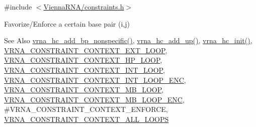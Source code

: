 {\ttfamily \#include $<$\hyperlink{constraints_8h}{Vienna\-R\-N\-A/constraints.\-h}$>$}



Favorize/\-Enforce a certain base pair (i,j) 

\begin{DoxySeeAlso}{See Also}
\hyperlink{group__hard__constraints_gadeb1083d0dc928e1e931065aae54ad82}{vrna\-\_\-hc\-\_\-add\-\_\-bp\-\_\-nonspecific()}, \hyperlink{group__hard__constraints_gaeb352e3e6ccd2b567bafa451365bb545}{vrna\-\_\-hc\-\_\-add\-\_\-up()}, \hyperlink{group__hard__constraints_ga36ff456c43bf920629cee5a236e4f0ff}{vrna\-\_\-hc\-\_\-init()}, \hyperlink{group__hard__constraints_ga9418eda62a5dec070896702c279d2548}{V\-R\-N\-A\-\_\-\-C\-O\-N\-S\-T\-R\-A\-I\-N\-T\-\_\-\-C\-O\-N\-T\-E\-X\-T\-\_\-\-E\-X\-T\-\_\-\-L\-O\-O\-P}, \hyperlink{group__hard__constraints_ga79203702b197b6b9d3b78eed40663eb1}{V\-R\-N\-A\-\_\-\-C\-O\-N\-S\-T\-R\-A\-I\-N\-T\-\_\-\-C\-O\-N\-T\-E\-X\-T\-\_\-\-H\-P\-\_\-\-L\-O\-O\-P}, \hyperlink{group__hard__constraints_ga21feeab3a9e5fa5a9e3d9ac0fcf5994f}{V\-R\-N\-A\-\_\-\-C\-O\-N\-S\-T\-R\-A\-I\-N\-T\-\_\-\-C\-O\-N\-T\-E\-X\-T\-\_\-\-I\-N\-T\-\_\-\-L\-O\-O\-P}, \hyperlink{group__hard__constraints_ga0536288e04ff6332ecdc23ca4705402b}{V\-R\-N\-A\-\_\-\-C\-O\-N\-S\-T\-R\-A\-I\-N\-T\-\_\-\-C\-O\-N\-T\-E\-X\-T\-\_\-\-I\-N\-T\-\_\-\-L\-O\-O\-P\-\_\-\-E\-N\-C}, \hyperlink{group__hard__constraints_ga456ecd2ff00056bb64da8dd4f61bbfc5}{V\-R\-N\-A\-\_\-\-C\-O\-N\-S\-T\-R\-A\-I\-N\-T\-\_\-\-C\-O\-N\-T\-E\-X\-T\-\_\-\-M\-B\-\_\-\-L\-O\-O\-P}, \hyperlink{group__hard__constraints_ga02a3d703ddbcfce393e4bbfcb9db7077}{V\-R\-N\-A\-\_\-\-C\-O\-N\-S\-T\-R\-A\-I\-N\-T\-\_\-\-C\-O\-N\-T\-E\-X\-T\-\_\-\-M\-B\-\_\-\-L\-O\-O\-P\-\_\-\-E\-N\-C}, \#\-V\-R\-N\-A\-\_\-\-C\-O\-N\-S\-T\-R\-A\-I\-N\-T\-\_\-\-C\-O\-N\-T\-E\-X\-T\-\_\-\-E\-N\-F\-O\-R\-C\-E, \hyperlink{group__hard__constraints_ga886d9127c49bb982a4b67cd7581e8a5a}{V\-R\-N\-A\-\_\-\-C\-O\-N\-S\-T\-R\-A\-I\-N\-T\-\_\-\-C\-O\-N\-T\-E\-X\-T\-\_\-\-A\-L\-L\-\_\-\-L\-O\-O\-P\-S}
\end{DoxySeeAlso}

